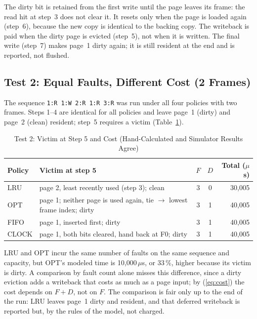\documentclass[conference,a4paper]{IEEEtran}
\newcommand{\code}[1]{\texttt{#1}}
\begin{document}


The dirty bit is retained from the first write until the page leaves its frame: the read hit at step~3 does not clear it. It resets only when the page is loaded again (step~6), because the new copy is identical to the backing copy. The writeback is paid when the dirty page is evicted (step~5), not when it is written. The final write (step~7) makes page~1 dirty again; it is still resident at the end and is reported, not flushed.

\subsection{Test 2: Equal Faults, Different Cost (2 Frames)}
The sequence \code{1:R 1:W 2:R 1:R 3:R} was run under all four policies with two frames. Steps 1--4 are identical for all policies and leave page~1 (dirty) and page~2 (clean) resident; step~5 requires a victim (Table~\ref{tab:t2}).

\begin{table}[!tb]
\renewcommand{\arraystretch}{1.1}
\setlength{\tabcolsep}{3pt}
\caption{Test 2: Victim at Step 5 and Cost (Hand-Calculated and Simulator Results Agree)}
\label{tab:t2}
\centering\footnotesize
\begin{tabular}{l p{3.3cm} c c r}
\toprule
Policy & Victim at step 5 & $F$ & $D$ & Total ($\mu$s) \\
\midrule
LRU   & page 2, least recently used (step 3); clean & 3 & 0 & 30{,}005 \\
OPT   & page 1; neither page is used again, tie $\to$ lowest frame index; dirty & 3 & 1 & 40{,}005 \\
FIFO  & page 1, inserted first; dirty & 3 & 1 & 40{,}005 \\
CLOCK & page 1, both bits cleared, hand back at F0; dirty & 3 & 1 & 40{,}005 \\
\bottomrule
\end{tabular}
\end{table}

LRU and OPT incur the same number of faults on the same sequence and capacity, but OPT's modeled time is 10{,}000\,$\mu$s, or 33\,\%, higher because its victim is dirty. A comparison by fault count alone misses this difference, since a dirty eviction adds a writeback that costs as much as a page input; by (\ref{eq:cost}) the cost depends on $F + D$, not on $F$. The comparison is fair only up to the end of the run: LRU leaves page~1 dirty and resident, and that deferred writeback is reported but, by the rules of the model, not charged.
\end{document}
